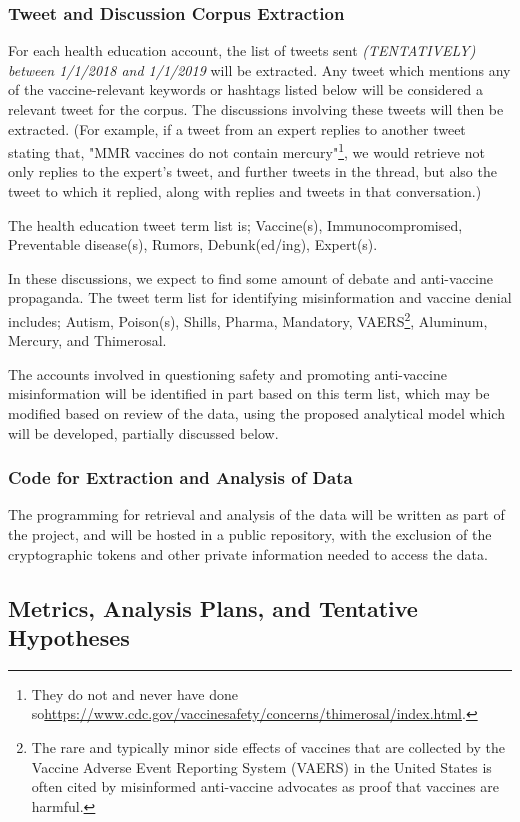 \documentclass{article}
\begin{document}
\subsubsection{Tweet and Discussion Corpus Extraction}

For each health education account, the list of tweets sent \textit{(TENTATIVELY) between 1/1/2018 and 1/1/2019} will be extracted. Any tweet which mentions any of the vaccine-relevant keywords or hashtags listed below will be considered a relevant tweet for the corpus. The discussions involving these tweets will then be extracted. (For example, if a tweet from an expert replies to another tweet stating that, "MMR vaccines do not contain mercury"\footnote{They do not and never have done so\url{https://www.cdc.gov/vaccinesafety/concerns/thimerosal/index.html}.}, we would retrieve not only replies to the expert's tweet, and further tweets in the thread, but also the tweet to which it replied, along with replies and tweets in that conversation.)

The health education tweet term list is; Vaccine(s), Immunocompromised, Preventable disease(s), Rumors, Debunk(ed/ing), Expert(s).

In these discussions, we expect to find some amount of debate and anti-vaccine propaganda. The tweet term list for identifying misinformation and vaccine denial includes; Autism, Poison(s), Shills, Pharma, Mandatory, VAERS\footnote{The rare and typically minor side effects of vaccines that are collected by the Vaccine Adverse Event Reporting System (VAERS) in the United States is often cited by misinformed anti-vaccine advocates as proof that vaccines are harmful.}, Aluminum, Mercury, and Thimerosal.

The accounts involved in questioning safety and promoting anti-vaccine misinformation will be identified in part based on this term list, which may be modified based on review of the data, using the proposed analytical model which will be developed, partially discussed below.

\subsubsection{Code for Extraction and Analysis of Data}
The programming for retrieval and analysis of the data will be written as part of the project, and will be hosted in a public repository, with the exclusion of the cryptographic tokens and other private information needed to access the data.

\subsection{Metrics, Analysis Plans, and Tentative Hypotheses}
\end{document}
